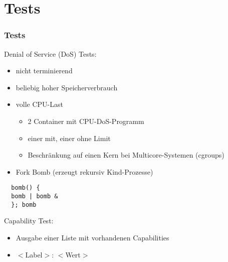 \section{Tests}

\begin{frame}[fragile]
 \frametitle{Tests}
 Denial of Service (DoS) Tests:
 \begin{itemize}
  \item nicht terminierend
  \item beliebig hoher Speicherverbrauch
  \item volle CPU-Last
  \begin{itemize}
   \item 2 Container mit CPU-DoS-Programm
   \item einer mit, einer ohne Limit
   \item Beschränkung auf einen Kern bei Multicore-Systemen (cgroups)
  \end{itemize}
  \pause
  \item Fork Bomb (erzeugt rekursiv Kind-Prozesse)
 \end{itemize}
 \begin{verbatim}
  bomb() {
  bomb | bomb &
  }; bomb 
 \end{verbatim}
 \pause
 Capability Test:
 \begin{itemize}
  \item Ausgabe einer Liste mit vorhandenen Capabilities
  \item $<$Label$>$: $<$Wert$>$
 \end{itemize}
\end{frame}
